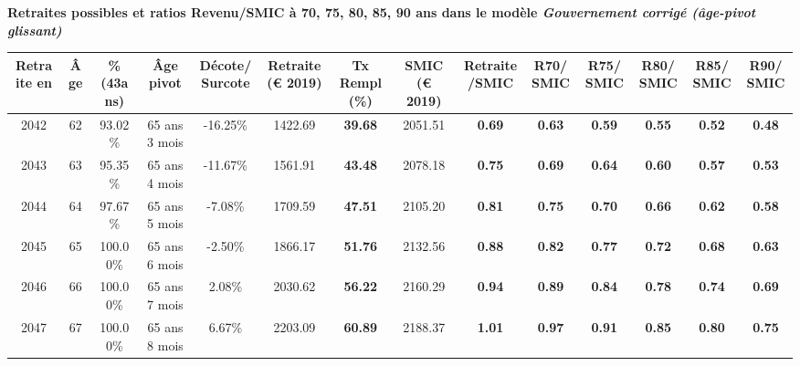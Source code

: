  \vspace{0.1cm} 
{\bf \noindent Retraites possibles et ratios Revenu/SMIC à 70, 75, 80, 85, 90 ans dans le modèle \emph{Gouvernement corrigé (âge-pivot glissant)}}  
 
\begin{adjustbox}{max width=\textwidth} 
\begin{tabular}[htb]{|c|c||c|c|c||c|c||c|c||c|c|c|c|c|} 
\hline 
 Retraite en &  Âge &  \%(43ans) &  Âge pivot &  Décote/Surcote &  Retraite (\euro{} 2019) &  Tx Rempl(\%) &  SMIC (\euro{} 2019) &  Retraite/SMIC &  R70/SMIC &  R75/SMIC &  R80/SMIC &  R85/SMIC &  R90/SMIC \\ 
\hline \hline 
 2042 &  62 &  93.02\% &  65 ans 3 mois &  -16.25\% &  1422.69 &  {\bf 39.68} &  2051.51 &  {\bf {\color{red} 0.69}} &  {\bf {\color{red} 0.63}} &  {\bf {\color{red} 0.59}} &  {\bf {\color{red} 0.55}} &  {\bf {\color{red} 0.52}} &  {\bf {\color{red} 0.48}} \\ 
\hline 
 2043 &  63 &  95.35\% &  65 ans 4 mois &  -11.67\% &  1561.91 &  {\bf 43.48} &  2078.18 &  {\bf {\color{red} 0.75}} &  {\bf {\color{red} 0.69}} &  {\bf {\color{red} 0.64}} &  {\bf {\color{red} 0.60}} &  {\bf {\color{red} 0.57}} &  {\bf {\color{red} 0.53}} \\ 
\hline 
 2044 &  64 &  97.67\% &  65 ans 5 mois &  -7.08\% &  1709.59 &  {\bf 47.51} &  2105.20 &  {\bf {\color{red} 0.81}} &  {\bf {\color{red} 0.75}} &  {\bf {\color{red} 0.70}} &  {\bf {\color{red} 0.66}} &  {\bf {\color{red} 0.62}} &  {\bf {\color{red} 0.58}} \\ 
\hline 
 2045 &  65 &  100.00\% &  65 ans 6 mois &  -2.50\% &  1866.17 &  {\bf 51.76} &  2132.56 &  {\bf {\color{red} 0.88}} &  {\bf {\color{red} 0.82}} &  {\bf {\color{red} 0.77}} &  {\bf {\color{red} 0.72}} &  {\bf {\color{red} 0.68}} &  {\bf {\color{red} 0.63}} \\ 
\hline 
 2046 &  66 &  100.00\% &  65 ans 7 mois &  2.08\% &  2030.62 &  {\bf 56.22} &  2160.29 &  {\bf {\color{red} 0.94}} &  {\bf {\color{red} 0.89}} &  {\bf {\color{red} 0.84}} &  {\bf {\color{red} 0.78}} &  {\bf {\color{red} 0.74}} &  {\bf {\color{red} 0.69}} \\ 
\hline 
 2047 &  67 &  100.00\% &  65 ans 8 mois &  6.67\% &  2203.09 &  {\bf 60.89} &  2188.37 &  {\bf 1.01} &  {\bf {\color{red} 0.97}} &  {\bf {\color{red} 0.91}} &  {\bf {\color{red} 0.85}} &  {\bf {\color{red} 0.80}} &  {\bf {\color{red} 0.75}} \\ 
\hline 
\hline 
\end{tabular} 
\end{adjustbox} 
 
